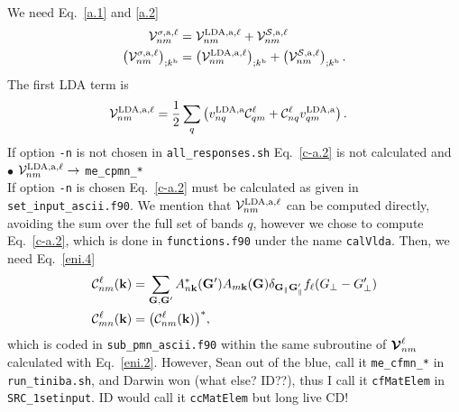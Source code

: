 We need Eq.~\eqref{a.1} and \eqref{a.2}
\begin{align}\label{c-a.1}
{\mathbf{\cal V}}^{\sigma,\mathrm{a},\ell}_{nm}
&=
{\mathbf{\cal V}}^{\mathrm{LDA},\mathrm{a},\ell}_{nm}
+
{\mathbf{\cal V}}^{{\cal S},\mathrm{a},\ell}_{nm}
\nonumber\\
\left(
{\mathbf{\cal V}}^{\sigma,\mathrm{a},\ell}_{nm}
\right)_{;k^{\mathrm{b}}}
&=
\left(
{\mathbf{\cal V}}^{\mathrm{LDA},\mathrm{a},\ell}_{nm}
\right)_{;k^{\mathrm{b}}}
+
\left(
{\mathbf{\cal V}}^{{\cal S},\mathrm{a},\ell}_{nm}
\right)_{;k^{\mathrm{b}}}
.
\end{align}
 The first LDA term is
\begin{align}\label{c-a.2}
{\mathbf{\cal V}}^{\mathrm{LDA},\mathrm{a},\ell}_{nm}
&=
\frac{1}{2}\sum_q\left(
v^{\mathrm{LDA},\mathrm{a}}_{nq}{\mathbf{\cal C}}^\ell_{qm}+{\mathbf{\cal C}}^\ell_{nq} v^{\mathrm{LDA},\mathrm{a}}_{qm}
\right)
.
\end{align} 
If option \verb=-n= is not chosen in \verb=all_responses.sh=
Eq.~\eqref{c-a.2}
 is
not calculated and\\
$\bullet$ ${\mathbf{\cal V}}^{\mathrm{LDA},\mathrm{a},\ell}_{nm}\to$ \verb=me_cpmn_*=\\  
If option \verb=-n= is chosen Eq.~\eqref{c-a.2}
 must be calculated as given in
\verb=set_input_ascii.f90=. We mention that
${\mathbf{\cal V}}^{\mathrm{LDA},\mathrm{a},\ell}_{nm}$ can be computed directly,\cite{nicolaspc}
avoiding the sum over the full set of bands $q$, however we chose to
compute Eq.~\eqref{c-a.2}, which is done in
\verb=functions.f90= under the name \verb=calVlda=.
Then, we need 
Eq.~\eqref{eni.4}
\begin{align}\label{c-eni.4}
{\mathbf{\cal C}}^\ell_{nm}(\mathbf{k})&=
\sum_{\mathbf{G},\mathbf{G}'} A^*_{n\mathbf{k}}(\mathbf{G}')  A_{m\mathbf{k}}(\mathbf{G})
\delta_{\mathbf{G}_\parallel \mathbf{G}'_\parallel}
f_\ell(G_\perp-G'_\perp)
\nonumber\\
{\mathbf{\cal C}}^\ell_{mn}(\mathbf{k})&=
\big({\mathbf{\cal C}}^\ell_{nm}(\mathbf{k})\big)^*
,
\end{align} 
which is coded in \verb=sub_pmn_ascii.f90= within the same subroutine of $\boldsymbol{\mathcal{\cal V}}^\ell_{nm}$
calculated with Eq.~\eqref{eni.2}. However, Sean out of the blue, call
it \verb=me_cfmn_*= in \verb=run_tiniba.sh=,
 and Darwin won (what else? ID??), 
thus I call it \verb=cfMatElem= in \verb=SRC_1setinput=. ID would call
it  \verb=ccMatElem=
but long live CD!


